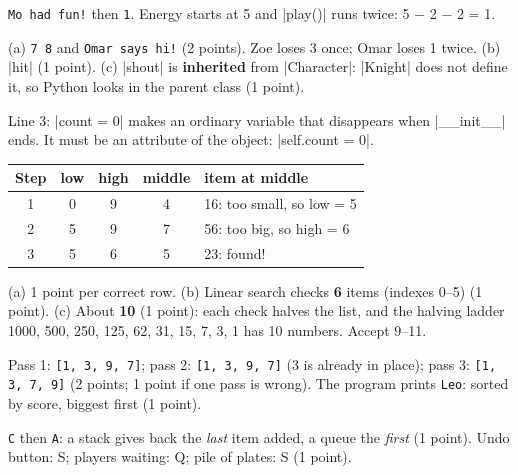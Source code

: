 \begin{answer}
\texttt{Mo had fun!} then \texttt{1}. Energy starts at 5 and \py|play()| runs twice: 5 $-$ 2 $-$ 2 = 1.
\end{answer}

\begin{answer}
(a) \texttt{7 8} and \texttt{Omar says hi!} (2 points). Zoe loses 3 once; Omar loses 1 twice.
(b) \py|hit| (1 point). (c) \py|shout| is \textbf{inherited} from \py|Character|: \py|Knight|
does not define it, so Python looks in the parent class (1 point).
\end{answer}

\begin{answer}
Line 3: \py|count = 0| makes an ordinary variable that disappears when \py|__init__| ends. It must
be an attribute of the object: \py|self.count = 0|.
\end{answer}

\begin{answer}
\begin{center}
\renewcommand{\arraystretch}{1.3}
\begin{tabular}{|c|c|c|c|l|}
\hline
\textbf{Step} & \textbf{low} & \textbf{high} & \textbf{middle} & \textbf{item at middle}\\ \hline
1 & 0 & 9 & 4 & 16: too small, so low = 5\\ \hline
2 & 5 & 9 & 7 & 56: too big, so high = 6\\ \hline
3 & 5 & 6 & 5 & 23: found!\\ \hline
\end{tabular}
\end{center}
(a) 1 point per correct row. (b) Linear search checks \textbf{6} items (indexes 0--5) (1 point).
(c) About \textbf{10} (1 point): each check halves the list, and the halving ladder 1000, 500, 250,
125, 62, 31, 15, 7, 3, 1 has 10 numbers. Accept 9--11.
\end{answer}

\begin{answer}
Pass 1: \texttt{[1, 3, 9, 7]}; pass 2: \texttt{[1, 3, 9, 7]} (3 is already in place);
pass 3: \texttt{[1, 3, 7, 9]} (2 points; 1 point if one pass is wrong). The program prints
\texttt{Leo}: sorted by score, biggest first (1 point).
\end{answer}

\begin{answer}
\texttt{C} then \texttt{A}: a stack gives back the \emph{last} item added, a queue the
\emph{first} (1 point). Undo button: S; players waiting: Q; pile of plates: S (1 point).
\end{answer}

